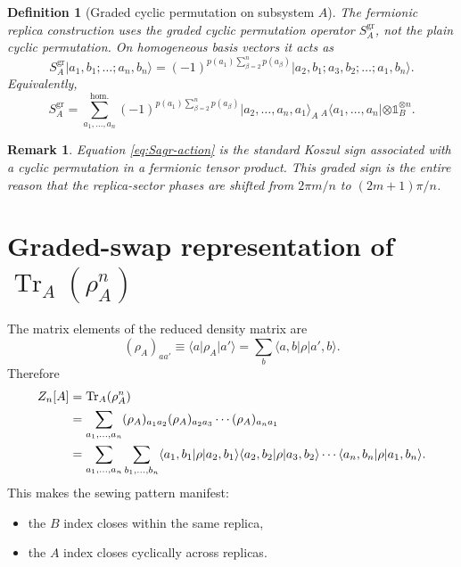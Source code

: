 \documentclass[11pt]{article}
\newtheorem{remark}{Remark}
\newtheorem{definition}{Definition}
\newcommand{\Tr}{\operatorname{Tr}}
\newcommand{\1}{\mathds{1}}
\begin{document}
\begin{definition}[Graded cyclic permutation on subsystem $A$]
The fermionic replica construction uses the \emph{graded} cyclic permutation
operator $S_A^{\mathrm{gr}}$, not the plain cyclic permutation. On homogeneous
basis vectors it acts as
\begin{equation}
S_A^{\mathrm{gr}}
\lvert a_1,b_1;\dots;a_n,b_n\rangle
=
(-1)^{p(a_1)\sum_{\beta=2}^n p(a_\beta)}
\lvert a_2,b_1;a_3,b_2;\dots;a_1,b_n\rangle.
\label{eq:Sagr-action}
\end{equation}
Equivalently,
\begin{equation}
S_A^{\mathrm{gr}}
=
\sum_{a_1,\dots,a_n}^{\mathrm{hom.}}
(-1)^{p(a_1)\sum_{\beta=2}^n p(a_\beta)}
\lvert a_2,\dots,a_n,a_1\rangle_A
\,{}_A\langle a_1,\dots,a_n|
\otimes \1_B^{\otimes n}.
\label{eq:Sagr-explicit}
\end{equation}
\end{definition}

\begin{remark}
Equation \eqref{eq:Sagr-action} is the standard Koszul sign associated with a
cyclic permutation in a fermionic tensor product. This graded sign is the
entire reason that the replica-sector phases are shifted from
$2\pi m/n$ to $(2m+1)\pi/n$.
\end{remark}

\section{Graded-swap representation of $\Tr_A(\rho_A^n)$}

The matrix elements of the reduced density matrix are
\begin{equation}
(\rho_A)_{aa'}
\equiv
\langle a\lvert \rho_A\rvert a'\rangle
=
\sum_b \langle a,b\lvert \rho \rvert a',b\rangle.
\label{eq:rhoA-components}
\end{equation}
Therefore
\begin{align}
Z_n[A]
&=\Tr_A(\rho_A^n)
\notag\\
&=
\sum_{a_1,\dots,a_n}
(\rho_A)_{a_1a_2}
(\rho_A)_{a_2a_3}
\cdots
(\rho_A)_{a_n a_1}
\notag\\
&=
\sum_{a_1,\dots,a_n}
\sum_{b_1,\dots,b_n}
\langle a_1,b_1\lvert \rho \rvert a_2,b_1\rangle
\langle a_2,b_2\lvert \rho \rvert a_3,b_2\rangle
\cdots
\langle a_n,b_n\lvert \rho \rvert a_1,b_n\rangle.
\label{eq:Zn-component}
\end{align}
This makes the sewing pattern manifest:
\begin{itemize}[leftmargin=2em]
\item the $B$ index closes within the same replica,
\item the $A$ index closes cyclically across replicas.
\end{itemize}
\end{document}

